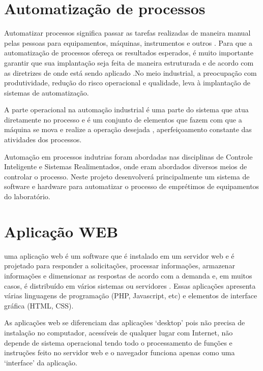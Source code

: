 \vspace{-42pt}
\section[Automatização de processos]{Automatização de processos}
Automatizar processos significa passar as tarefas realizadas de maneira manual pelas pessoas para equipamentos, máquinas, instrumentos e outros \cite{AutomatProcess}. Para que a automatização de processos ofereça os resultados esperados, é muito importante garantir que sua implantação seja feita de maneira estruturada e de acordo com as diretrizes de onde está sendo aplicado \cite{AutomatProcess2}.No meio industrial, a preocupação com produtividade, redução do risco operacional e qualidade, leva à implantação de sistemas de automatização. 

A parte operacional na automação industrial é uma parte do sistema que atua diretamente no processo e é um conjunto de elementos que fazem com que a máquina se mova e realize a operação desejada \cite{AutomatProcess3}, aperfeiçoamento constante das atividades dos processos.

Automação em processos indutrias foram abordadas nas disciplinas de Controle Inteligente e Sistemas Realimentados, onde eram abordados diversos meios de controlar o processo. Neste projeto desenvolverá principalmente um sistema de software e hardware para automatizar o processo de emprétimos de equipamentos do laboratório.

\section[Aplicação WEB]{Aplicação WEB}
uma aplicação web é um software que é instalado em um servidor web e é projetado para responder a solicitações, processar informações, armazenar informações e dimensionar as respostas de acordo com a demanda e, em muitos casos, é distribuído em vários sistemas ou servidores \cite{WEB1}. Essas aplicações apresenta várias linguagens de programação (PHP, Javascript, etc) e elementos de interface gráfica (HTML, CSS).

As aplicações web se diferenciam das aplicações ‘desktop’ pois não precisa de instalação no computador, acessíveis de qualquer lugar com Internet, não depende de sistema operacional tendo todo o processamento de funções e instruções feito no servidor web e o navegador funciona apenas como uma ‘interface’ da  aplicação. 


